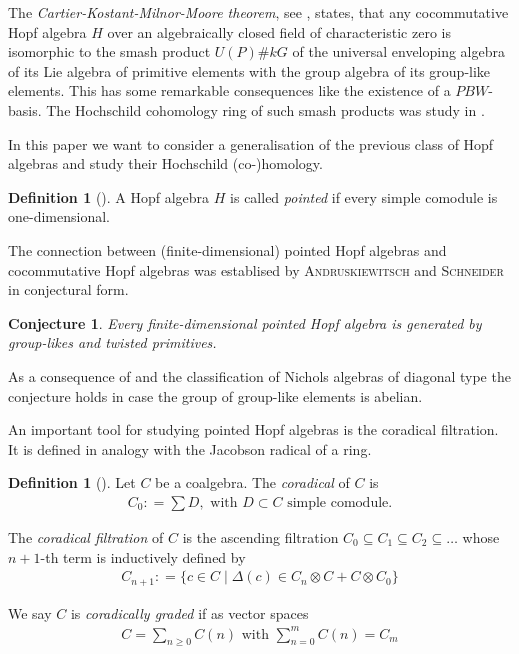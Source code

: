 \documentclass{amsart}
\newtheorem*{conjecture}{Conjecture}
\theoremstyle{definition}
\newtheorem{definition}[theorem]{Definition}
\newcommand{\emphaut}[1]{\textsc{#1}} %
\newcommand{\defeq}{{\colon =}}
\begin{document}
	The \emph{Cartier-Kostant-Milnor-Moore theorem}, see
	\cite{Sweedler1969, Montgomery1993}, states, that any cocommutative Hopf algebra $H$ over an algebraically closed field of characteristic zero is isomorphic to the smash product $U(P)\#kG$ of the universal enveloping algebra of its Lie algebra of primitive elements with the group algebra of its group-like elements.
	This has some remarkable consequences like the existence of a $PBW$-basis. 
	The Hochschild cohomology ring of such smash products was study in \cite{Burciu2007}.
	
	In this paper we want to consider a generalisation of the previous class of Hopf algebras and study their Hochschild (co-)homology.
	
	\begin{definition}[\cite{Radford2012}] \label{def: Pointed} %
		A Hopf algebra $H$ is called \emph{pointed} if every simple comodule is one-dimensional.
	\end{definition}

	The connection between (finite-dimensional) pointed Hopf algebras and cocommutative Hopf algebras was establised by 
	\emphaut{Andruskiewitsch} and \emphaut{Schneider} in conjectural form.
	\begin{conjecture}
		Every finite-dimensional pointed Hopf algebra is generated by group-likes and twisted primitives.
	\end{conjecture}
	As a consequence of \cite{Angiono2019} and the classification of Nichols algebras of diagonal type \cite{Heckenberger2009, Andruskiewitsch2017} the conjecture holds in case the group of group-like elements is abelian.
	
	An important tool for studying pointed Hopf algebras is the coradical filtration. It is defined in analogy with the Jacobson radical of a ring.
	
	\begin{definition}[\cite{Radford2012}]\label{def: Coradical} %
		Let $C$ be a coalgebra. The \emph{coradical} of $C$ is
		\begin{align}\label{eq: Coradical}
			C_0 \defeq \sum D, \text{ with } D\subset C \text{ simple comodule}.
		\end{align}
		
		The \emph{coradical filtration} of $C$ is the ascending filtration
		$C_0 \subseteq C_1 \subseteq C_2 \subseteq \dotsc$ whose $n {+} 1$-th term is inductively defined by
		\begin{align*}
			C_{n+1} \defeq \{ c\in C \mid \Delta(c) \in C_n \otimes C + C \otimes C_0 \}
		\end{align*} 
		
		We say $C$ is \emph{coradically graded} if  as vector spaces
		\begin{align*}
		 	C= \sum _{n \geq 0} C(n) \text{ with } \sum _{n = 0}^m C(n)= C_m
		\end{align*}
	\end{definition}
\end{document}
